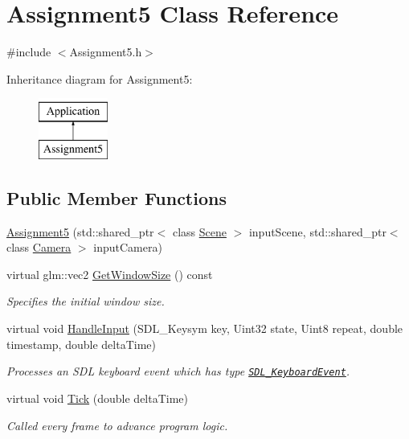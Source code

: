\hypertarget{class_assignment5}{}\section{Assignment5 Class Reference}
\label{class_assignment5}


{\ttfamily \#include $<$Assignment5.\+h$>$}

Inheritance diagram for Assignment5\+:\begin{figure}[H]
\begin{center}
\leavevmode
\includegraphics[height=2.000000cm]{class_assignment5}
\end{center}
\end{figure}
\subsection*{Public Member Functions}
\begin{DoxyCompactItemize}
\item
\hyperlink{class_assignment5_aee966f6188c377fd831e6edb97d1ee08}{Assignment5} (std\+::shared\+\_\+ptr$<$ class \hyperlink{class_scene}{Scene} $>$ input\+Scene, std\+::shared\+\_\+ptr$<$ class \hyperlink{class_camera}{Camera} $>$ input\+Camera)
\item
virtual glm\+::vec2 \hyperlink{class_assignment5_ac199b6149ffa3dbedc7e0d49bb24c628}{Get\+Window\+Size} () const
\begin{DoxyCompactList}\small\item\em Specifies the initial window size. \end{DoxyCompactList}\item
virtual void \hyperlink{class_assignment5_aab8f8440144665db9aafd7ca1cf55cff}{Handle\+Input} (S\+D\+L\+\_\+\+Keysym key, Uint32 state, Uint8 repeat, double timestamp, double delta\+Time)
\begin{DoxyCompactList}\small\item\em Processes an S\+DL keyboard event which has type \href{https://wiki.libsdl.org/SDL_KeyboardEvent}{\tt S\+D\+L\+\_\+\+Keyboard\+Event}. \end{DoxyCompactList}\item
virtual void \hyperlink{class_assignment5_a34cdf7bc962c3a0e3959c77a24c54d79}{Tick} (double delta\+Time)
\begin{DoxyCompactList}\small\item\em Called every frame to advance program logic. \end{DoxyCompactList}\end{DoxyCompactItemize}
